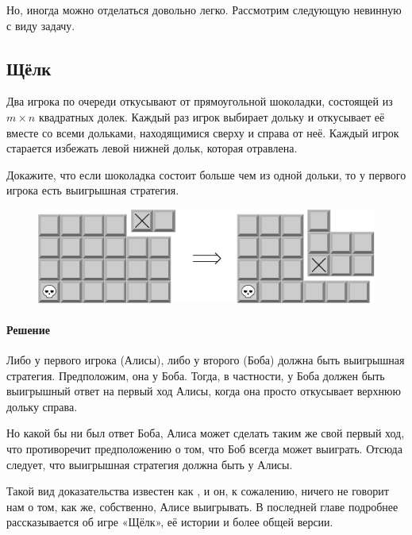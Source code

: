 \documentclass[twoside]{book}
\makeatletter
\newcommand{\rindex}[2][\imki@jobname]{%
  \index[#1]{\detokenize{#2}}%
}
\makeatother
\begin{document}
Но, иногда можно отделаться довольно легко.
Рассмотрим следующую невинную с виду задачу.

\subsection*{Щёлк}%
\rindex{Щёлк}

Два игрока по очереди откусывают от прямоугольной шоколадки, состоящей из $m \times n$ квадратных долек.
Каждый раз игрок выбирает дольку и откусывает её вместе со всеми дольками, находящимися сверху и справа от неё.
Каждый игрок старается избежать левой нижней дольк, которая отравлена.

Докажите, что если шоколадка состоит больше чем из одной дольки, то у первого игрока есть выигрышная стратегия.

\begin{figure}[h]
\centering
\includegraphics{mp/wink-23}
\end{figure}

\paragraph{Решение} Либо у первого игрока (Алисы), либо у второго (Боба) должна быть выигрышная стратегия.
Предположим,  она  у Боба.
Тогда, в частности, у Боба должен быть выигрышный ответ на первый ход Алисы, когда она просто откусывает верхнюю дольку справа.

Но какой бы ни был ответ Боба, Алиса может сделать таким же свой первый ход, что противоречит предположению о том, что Боб всегда может выиграть.
Отсюда следует,
что выигрышная стратегия должна быть у Алисы.
\heart

Такой вид доказательства известен как , и он, к сожалению, ничего не говорит нам о том, как же, собственно, Алисе выигрывать.
В последней главе подробнее рассказывается об игре «Щёлк», её истории и более общей версии.

\medskip
\end{document}
